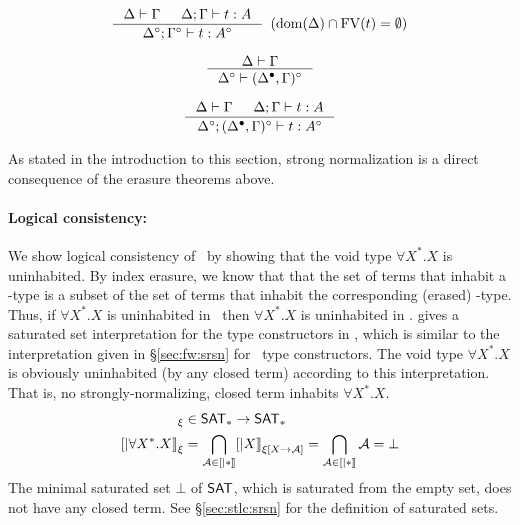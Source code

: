 \begin{theorem}
\label{thm:Fixierasetypingifree}
\[ \inference{ \Delta |- \Gamma & \Delta;\Gamma |- t : A}
                {\Delta^\circ;\Gamma^\circ |- t : A^\circ}
                {\enspace(\dom(\Delta)\cap\FV(t) = \emptyset)}
\]
\end{theorem}

\begin{theorem}
\label{thm:Fixierasetmctxivs}
\[ \inference{\Delta |- \Gamma}{\Delta^\circ |- (\Delta^\bullet,\Gamma)^\circ}
\]
\end{theorem}


\begin{theorem}
\label{thm:Fixierasetypingall}
\[ \inference{\Delta |- \Gamma & \Delta;\Gamma |- t : A}
                {\Delta^\circ;(\Delta^\bullet,\Gamma)^\circ |- t : A^\circ}
\]
\end{theorem}
As stated in the introduction to this section, strong normalization is a direct
consequence of the erasure theorems above.

\paragraph{Logical consistency:}
We show logical consistency of \Fixi\ by showing that the void type
$\forall X^{*}.X$ is uninhabited. By index erasure, we know that
that the set of terms that inhabit a \Fixi-type is a subset of
the set of terms that inhabit the corresponding (erased) \Fixw-type.
Thus, if $\forall X^{*}.X$ is uninhabited in \Fixw\ then 
$\forall X^{*}.X$ is uninhabited in \Fixi. \citet{AbeMat04} gives
a saturated set interpretation for the type constructors in \Fixw,
which is similar to the interpretation given in \S\ref{sec:fw:srsn} for
\Fw\ type constructors. The void type $\forall X^{*}.X$ is obviously
uninhabited (by any closed term) according to this interpretation. That is, no 
strongly-normalizing, closed term inhabits $\forall X^{*}.X$.
\begin{align*}
        [| \forall X^{*}.X |]_\xi &\in \SAT_{*} -> \SAT_{*} \\
        [| \forall X^{*}.X |]_\xi &
        = \bigcap_{\mathcal{A}\in[| * |]} [| X |]_{\xi[X\to\mathcal{A}]}
        = \bigcap_{\mathcal{A}\in[| * |]} \mathcal{A} = \bot
\end{align*}
The minimal saturated set $\bot$ of $\mathsf{SAT}$, which is saturated from
the empty set, does not have any closed term. See \S\ref{sec:stlc:srsn}
for the definition of saturated sets.


